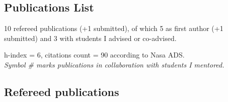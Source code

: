 

\vspace{-4mm}

\subsection*{\LARGE{Publications  List}}

\vspace{3mm}

10 refereed publications (+1 submitted), of which 5 as first author (+1 submitted) and 3 with students I advised or co-advised. %

h-index = 6, citations count = 90 according to Nasa ADS.\\

\textit{Symbol \# marks publications in collaboration with students I mentored.}

\vspace{2mm}

\subsection*{ Refereed publications}

